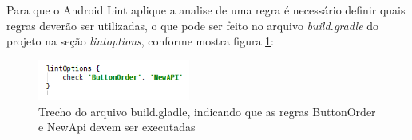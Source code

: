 Para que o Android Lint aplique a analise de uma regra é necessário definir quais 
regras deverão ser utilizadas, o que pode ser feito no arquivo {\it build.gradle} do 
projeto na seção {\it lintoptions}, conforme mostra figura \ref{lintoptions}:

\begin{figure}[h]
    \centering
    \includegraphics[width=5cm]{img/lintoptions}
    \caption[]{Trecho do arquivo build.gladle, indicando que as regras ButtonOrder e NewApi devem ser executadas}
    \label{lintoptions}
\end{figure}

